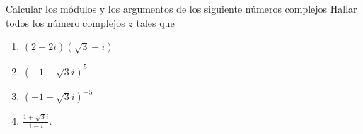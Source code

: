 \begin{enunciado}{\ejercicio}
  Calcular los módulos y los argumentos de los siguiente números complejos
  Hallar todos los número complejos $z$ tales que
  \begin{multicols}{4}
    \begin{enumerate}[label=\roman*)]
      \item $(2+2i)(\sqrt{3} - i)$
      \item $(-1 + \sqrt{3}i)^5$
      \item $(-1 + \sqrt{3}i)^{-5}$
      \item $\displaystyle\frac{1+\sqrt{3}i}{1-i}$.
    \end{enumerate}
  \end{multicols}
\end{enunciado}

